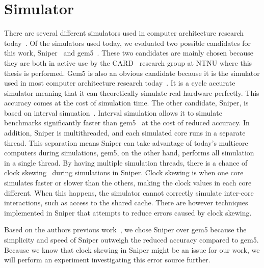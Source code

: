 \section{Simulator}
\label{sec:framework:simulator}

There are several different simulators used in computer architecture research today~\cite{Carlson2011a, Binkert2011, Miller2010, Pellauer2011}.
Of the simulators used today, we evaluated two possible candidates for this work, Sniper~\cite{Carlson2011a} and gem5~\cite{Binkert2011}.
These two candidates are mainly chosen because they are both in active use by the CARD~\cite{CARD2015} research group at NTNU where this thesis is performed.
Gem5 is also an obvious candidate because it is the simulator used in most computer architecture research today~\cite{Chen-Han2014}.
It is a cycle accurate simulator meaning that it can theoretically simulate real hardware perfectly.
This accuracy comes at the cost of simulation time.
The other candidate, Sniper, is based on interval simuation~\cite{Genbrugge2010}. 
Interval simulation allows it to simulate benchmarks significantly faster than gem5~\cite{Carlson2011a, Olsen2014} at the cost of reduced accuracy.
In addition, Sniper is multithreaded, and each simulated core runs in a separate thread.
This separation means Sniper can take advantage of today's multicore computers during simulations, gem5, on the other hand, performs all simulation in a single thread.
By having multiple simulation threads, there is a chance of clock skewing~\cite{Carlson2011a} during simulations in Sniper.
Clock skewing is when one core simulates faster or slower than the others, making the clock values in each core different.
When this happens, the simulator cannot correctly simulate inter-core interactions, such as access to the shared cache.
There are however techniques implemented in Sniper that attempts to reduce errors caused by clock skewing.

Based on the authors previous work~\cite{Olsen2014}, we chose Sniper over gem5 because the simplicity and speed of Sniper outweigh the reduced accuracy compared to gem5.
Because we know that clock skewing in Sniper might be an issue for our work, we will perform an experiment investigating this error source further.